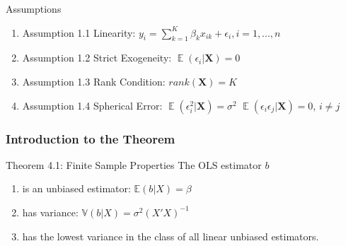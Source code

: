 \documentclass{beamer}
\DeclareMathOperator{\EX}{\mathbb{E}}%
\begin{document}
\begin{frame}

\begin{block}{Assumptions}
\begin{enumerate}

    \item   <1->    Assumption 1.1 Linearity:  
    \newline
    $y_{i} = \sum\limits_{k=1}^K \beta_{k}x_{ik} + \epsilon_{i},    i = 1,...,n$
    \item   <2->    Assumption 1.2 Strict Exogeneity: 
    \newline
    $\EX(\epsilon_{i}|\textbf{X}) = 0$
    
    \item   <3->    Assumption 1.3 Rank Condition: 
    \newline
    $rank(\textbf{X}) = K$
    
    \item   <4->    Assumption 1.4 Spherical Error: 
    \newline
    $\EX(\epsilon_{i}^{2}|\textbf{X}) = \sigma^{2}$
    \newline
    $\EX(\epsilon_{i}\epsilon_{j}|\textbf{X}) = 0$, $i \neq j$
    
    
    
\end{enumerate}
\end{block}  
\end{frame}



\begin{frame}

\frametitle{Introduction to the Theorem}


\begin{block}{Theorem 4.1: Finite Sample Properties}
The OLS estimator $b$
\begin{enumerate}

	\item	<1->	is an unbiased estimator: $ \mathbb{E}(b|X) = \beta $
	
	\item	<2->	has variance: $ \mathbb{V}(b | X) = \sigma^{ 2 } (X'X)^{ -1 } $
	
	\item	<3->    has the lowest variance in the class of all linear unbiased estimators.
	
\end{enumerate}
\end{block}
\end{frame}
\end{document}
